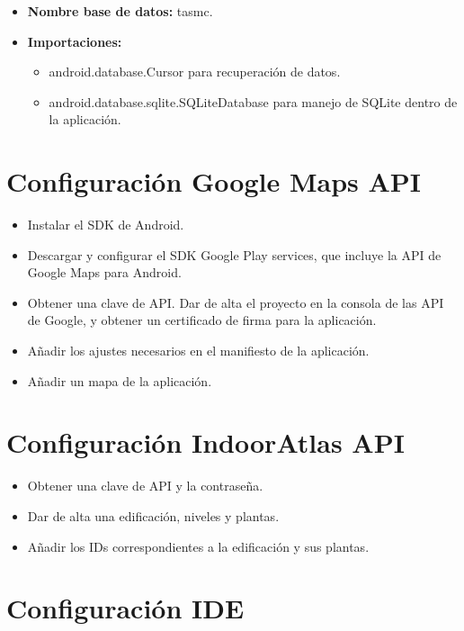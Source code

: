 \begin{itemize}
	\item \textbf{Nombre base de datos: } tasmc.
	\item \textbf{Importaciones: }
	\begin{itemize}
		\item android.database.Cursor para recuperación de datos.
		\item android.database.sqlite.SQLiteDatabase para manejo de SQLite dentro de la aplicación.
	\end{itemize}
\end{itemize}

\section{Configuración Google Maps API}

\begin{itemize}
	\item Instalar el SDK de Android. 
	\item Descargar y configurar el SDK Google Play services, que incluye la API de Google Maps para Android. 
	\item Obtener una clave de API. Dar de alta el proyecto en la consola de las API de Google, y obtener un certificado de firma para la aplicación. 
	\item Añadir los ajustes necesarios en el manifiesto de la aplicación. 
	\item Añadir un mapa de la aplicación. 
\end{itemize}

\section{Configuración IndoorAtlas API}

\begin{itemize}
	\item Obtener una clave de API y la contraseña.
	\item Dar de alta una edificación, niveles y plantas.
	\item Añadir los IDs correspondientes a la edificación y  sus plantas.
\end{itemize}

\section{Configuración IDE}

